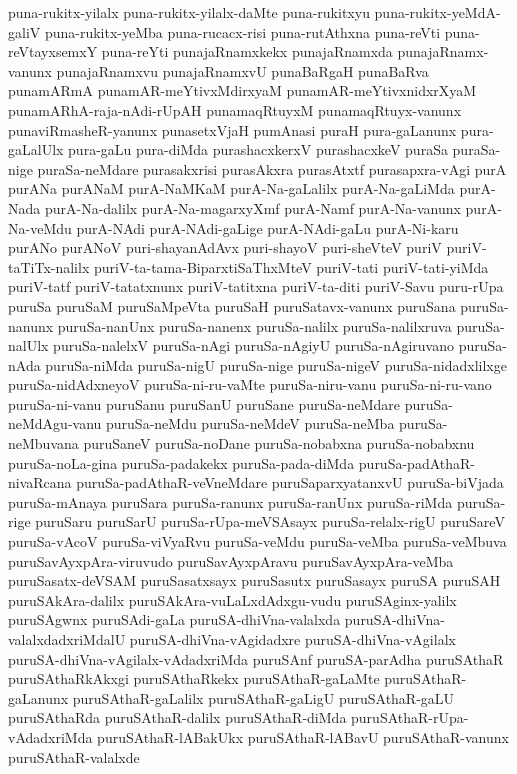 {puna-rukitx-yilalx
puna-rukitx-yilalx-daMte
puna-rukitxyu
puna-rukitx-yeMdA-galiV
puna-rukitx-yeMba
puna-rucacx-risi
puna-rutAthxna
puna-reVti
puna-reVtayxsemxY
puna-reYti
punajaRnamxkekx
punajaRnamxda
punajaRnamx-vanunx
punajaRnamxvu
punajaRnamxvU
punaBaRgaH
punaBaRva
punamARmA
punamAR-meYtivxMdirxyaM
punamAR-meYtivxnidxrXyaM
punamARhA-raja-nAdi-rUpAH
punamaqRtuyxM
punamaqRtuyx-vanunx
punaviRmasheR-yanunx
punasetxVjaH
pumAnasi
puraH
pura-gaLanunx
pura-gaLalUlx
pura-gaLu
pura-diMda
purashacxkerxV
purashacxkeV
puraSa
puraSa-nige
puraSa-neMdare
purasakxrisi
purasAkxra
purasAtxtf
purasapxra-vAgi
purA
purANa
purANaM
purA-NaMKaM
purA-Na-gaLalilx
purA-Na-gaLiMda
purA-Nada
purA-Na-dalilx
purA-Na-magarxyXmf
purA-Namf
purA-Na-vanunx
purA-Na-veMdu
purA-NAdi
purA-NAdi-gaLige
purA-NAdi-gaLu
purA-Ni-karu
purANo
purANoV
puri-shayanAdAvx
puri-shayoV
puri-sheVteV
puriV
puriV-taTiTx-nalilx
puriV-ta-tama-BiparxtiSaThxMteV
puriV-tati
puriV-tati-yiMda
puriV-tatf
puriV-tatatxnunx
puriV-tatitxna
puriV-ta-diti
puriV-Savu
puru-rUpa
puruSa
puruSaM
puruSaMpeVta
puruSaH
puruSatavx-vanunx
puruSana
puruSa-nanunx
puruSa-nanUnx
puruSa-nanenx
puruSa-nalilx
puruSa-nalilxruva
puruSa-nalUlx
puruSa-nalelxV
puruSa-nAgi
puruSa-nAgiyU
puruSa-nAgiruvano
puruSa-nAda
puruSa-niMda
puruSa-nigU
puruSa-nige
puruSa-nigeV
puruSa-nidadxlilxge
puruSa-nidAdxneyoV
puruSa-ni-ru-vaMte
puruSa-niru-vanu
puruSa-ni-ru-vano
puruSa-ni-vanu
puruSanu
puruSanU
puruSane
puruSa-neMdare
puruSa-neMdAgu-vanu
puruSa-neMdu
puruSa-neMdeV
puruSa-neMba
puruSa-neMbuvana
puruSaneV
puruSa-noDane
puruSa-nobabxna
puruSa-nobabxnu
puruSa-noLa-gina
puruSa-padakekx
puruSa-pada-diMda
puruSa-padAthaR-nivaRcana
puruSa-padAthaR-veVneMdare
puruSaparxyatanxvU
puruSa-biVjada
puruSa-mAnaya
puruSara
puruSa-ranunx
puruSa-ranUnx
puruSa-riMda
puruSa-rige
puruSaru
puruSarU
puruSa-rUpa-meVSAsayx
puruSa-relalx-rigU
puruSareV
puruSa-vAcoV
puruSa-viVyaRvu
puruSa-veMdu
puruSa-veMba
puruSa-veMbuva
puruSavAyxpAra-viruvudo
puruSavAyxpAravu
puruSavAyxpAra-veMba
puruSasatx-deVSAM
puruSasatxsayx
puruSasutx
puruSasayx
puruSA
puruSAH
puruSAkAra-dalilx
puruSAkAra-vuLaLxdAdxgu-vudu
puruSAginx-yalilx
puruSAgwnx
puruSAdi-gaLa
puruSA-dhiVna-valalxda
puruSA-dhiVna-valalxdadxriMdalU
puruSA-dhiVna-vAgidadxre
puruSA-dhiVna-vAgilalx
puruSA-dhiVna-vAgilalx-vAdadxriMda
puruSAnf
puruSA-parAdha
puruSAthaR
puruSAthaRkAkxgi
puruSAthaRkekx
puruSAthaR-gaLaMte
puruSAthaR-gaLanunx
puruSAthaR-gaLalilx
puruSAthaR-gaLigU
puruSAthaR-gaLU
puruSAthaRda
puruSAthaR-dalilx
puruSAthaR-diMda
puruSAthaR-rUpa-vAdadxriMda
puruSAthaR-lABakUkx
puruSAthaR-lABavU
puruSAthaR-vanunx
puruSAthaR-valalxde
}
